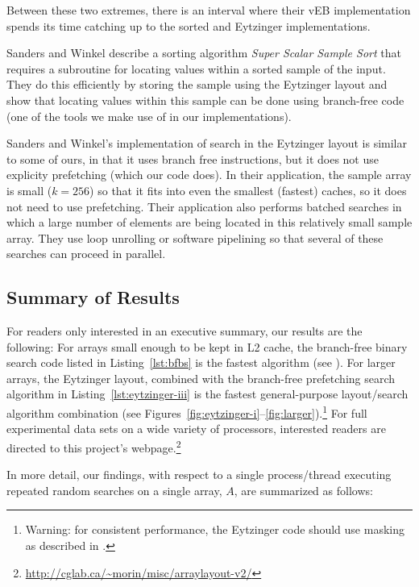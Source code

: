 \documentclass{patmorin}
\newcommand{\lstref}[1]{Listing~\ref{lst:#1}}
\begin{document}
Between these two extremes, there is an interval where their vEB
implementation spends its time catching up to the sorted and Eytzinger
implementations.

Sanders and Winkel \cite{sanders.winkel:super} describe a sorting
algorithm \emph{Super Scalar Sample Sort} that requires a subroutine
for locating values within a sorted sample of the input.  They do this
efficiently by storing the sample using the Eytzinger layout and show
that locating values within this sample can be done using branch-free code
(one of the tools we make use of in our implementations).

Sanders and Winkel's implementation of search in the Eytzinger layout is
similar to some of ours, in that it uses branch free instructions, but
it does not use explicity prefetching (which our code does).  In their
application, the sample array is small ($k=256$) so that it fits into even
the smallest (fastest) caches, so it does not need to use prefetching.
Their application also performs batched searches in which a large number
of elements are being located in this relatively small sample array.
They use loop unrolling or software pipelining so that several of these
searches can proceed in parallel.

\subsection{Summary of Results}

For readers only interested in an executive summary, our results
are the following: For arrays small enough to be kept in L2 cache,
the branch-free binary search code listed in \lstref{bfbs} is
the fastest algorithm (see ).  For larger
arrays, the Eytzinger layout, combined with the branch-free
prefetching search algorithm in \lstref{eytzinger-iii} is the
fastest general-purpose layout/search algorithm combination (see
Figures~\ref{fig:eytzinger-i}--\ref{fig:larger}).\footnote{Warning:
for consistent performance, the Eytzinger code should
use masking as described in .}
For full experimental data sets on a wide variety of
processors, interested readers are directed to this project's
webpage.\footnote{\url{http://cglab.ca/~morin/misc/arraylayout-v2/}}

In more detail, our findings, with respect to a single process/thread
executing repeated random searches on a single array, $A$, are summarized
as follows:
\end{document}
